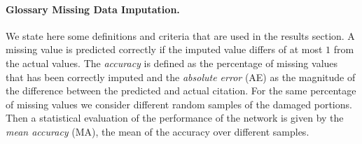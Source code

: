 \paragraph{Glossary Missing Data Imputation.}
We state here some definitions and criteria that are used in the results section.
A missing value is predicted correctly if the imputed value differs of at most $1$ from the actual values. 
The \emph{accuracy} is defined as the percentage of missing values that has been correctly imputed and the \emph{absolute error} (AE) as the magnitude of the difference between the predicted and actual citation.
For the same percentage of missing values we consider different random samples of the damaged portions. Then a statistical evaluation of the performance of the network is given by the \emph{mean accuracy} (MA), the mean of the accuracy over different samples.

